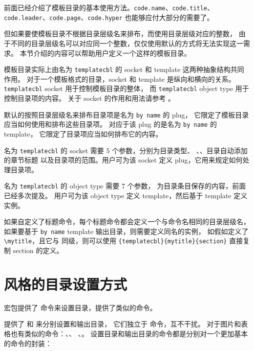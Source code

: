 \documentclass[twoside]{book}
\begin{document}
前面已经介绍了模板目录的基本使用方法。\texttt{code.name}、\texttt{code.title}、
\texttt{code.leader}、\texttt{code.page}、\texttt{code.hyper} 也能够应付大部分的需要了。

但如果要使模板目录不根据目录层级名来排布，而使用目录层级对应的整数，
由于不同的目录层级名可以对应同一个整数，仅仅使用默认的方式将无法实现这一需求。
本节介绍的内容可以帮助用户定义一个这样的模板目录。

模板目录实际上由名为 \texttt{templatecbl} 的 socket 和 template 这两种抽象结构共同作用。
对于一个模板格式的目录，socket 和 template 是纵向和横向的关系。
\texttt{templatecbl} socket 用于控制模板目录的整体，
而 \texttt{templatecbl} object type 用于控制目录项的内容。
关于 socket 的作用和用法请参考 。

默认的按照目录层级名来排布目录项是名为 \verb|by name| 的 plug，
它限定了模板目录应当如何使用和排布这些目录项。
对应于该 plug 的是名为 \verb|by name| 的 template，
它限定了目录项应当如何排布它的内容。

名为 \texttt{templatecbl} 的 socket 需要 5 个参数，分别为目录类型、
、、目录自动添加的章节标题
以及目录项的范围。用户可为该 socket 定义 plug，它用来规定如何处理目录项。

名为 \texttt{templatecbl} 的 object type 需要 7 个参数，
为目录条目保存的内容，前面已经多次提及。
用户可为该 object type 定义 template，然后基于 template 定义实例。

如果自定义了标题命令，每个标题命令都会定义一个与命令名相同的目录层级名，
如果要基于 \texttt{by name} template 输出目录，则需要定义同名的实例，
如假如定义了 \verb|\mytitle|，且它与  同级，则可以使用
 \verb|{templatecbl}{mytitle}{section}| 
直接复制 section 的定义。


\section{风格的目录设置方式}

 宏包提供了  命令来设置目录，\WhuTeX 提供了类似的命令。

\WhuTeX 提供了  和  来分别设置和输出目录，
它们独立于  命令，互不干扰。
对于图片和表格也有类似的命令：、、
、。
设置目录和输出目录的命令都是分别对一个更加基本的命令的封装：
\begin{xample}
\newcommand{\tocsetstyle}{\SetSpecifiedCombinedListStyle[toc]}
\newcommand{\specifiedtoc}{\SpecifiedCombinedList[toc]}
\newcommand{\lofsetstyle}{\SetSpecifiedCombinedListStyle[lof]{figure}}
\newcommand{\specifiedlof}{\SpecifiedCombinedList[lof]}
\newcommand{\lotsetstyle}{\SetSpecifiedCombinedListStyle[lot]{table}}
\newcommand{\specifiedlot}{\SpecifiedCombinedList[lot]}
\stopxamplecode
\xamplecode \medskip
\end{xample}
\end{document}
